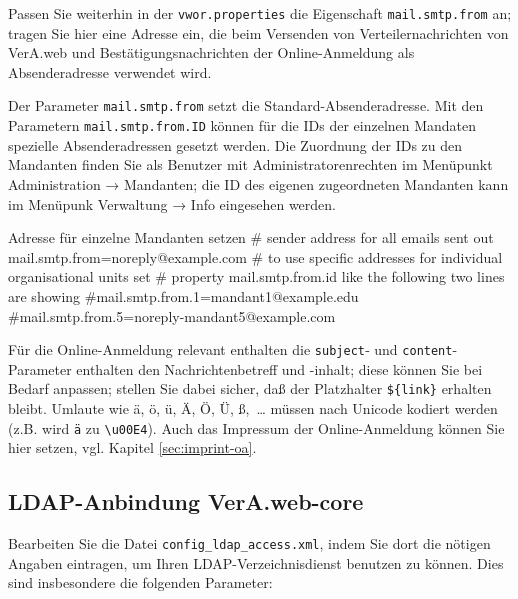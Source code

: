 \documentclass{tarentanleitung}
\begin{document}
\begin{minipage}{\linewidth}
Passen Sie weiterhin in der \texttt{vwor.properties} die Eigenschaft
\texttt{mail.smtp.from} an; tragen Sie hier eine Adresse ein, die beim
Versenden von Verteilernachrichten von VerA.web und Bestätigungsnachrichten der Online-Anmeldung
als Absenderadresse verwendet wird.

Der Parameter \texttt{mail.smtp.from} setzt die Standard-Absenderadresse.
Mit den Parametern \texttt{mail.smtp.from.ID} können für die IDs der einzelnen
Mandaten spezielle Absenderadressen gesetzt werden. Die Zuordnung der IDs zu
den Mandanten finden Sie als Benutzer mit Administratorenrechten im Menüpunkt
Administration → Mandanten; die ID des eigenen zugeordneten Mandanten kann
im Menüpunk Verwaltung → Info eingesehen werden.

\begin{lstdump}{Adresse für einzelne Mandanten setzen}
# sender address for all emails sent out
mail.smtp.from=noreply@example.com
# to use specific addresses for individual organisational units set
# property mail.smtp.from.{id} like the following two lines are showing
#mail.smtp.from.1=mandant1@example.edu
#mail.smtp.from.5=noreply-mandant5@example.com
\end{lstdump}

Für die Online-Anmeldung relevant enthalten die \texttt{subject}‑
und \texttt{content}-Parameter enthalten den Nachrichtenbetreff und
-inhalt; diese können Sie bei Bedarf anpassen; stellen Sie dabei
sicher, daß der Platzhalter \texttt{\$\{link\}} erhalten bleibt.
Umlaute wie ä, ö, ü, Ä, Ö, Ü, ß,~… müssen nach Unicode kodiert
werden (z.B. wird \texttt{ä} zu \texttt{\textbackslash{}u00E4}).
Auch das Impressum der Online-Anmeldung können Sie hier setzen,
vgl. Kapitel \ref{sec:imprint-oa}.


\end{minipage}

\subsection{LDAP-Anbindung VerA.web-core}\label{subsec:setup-core-ldap}

Bearbeiten Sie die Datei \texttt{config\_ldap\_access.xml}, indem Sie
dort die nötigen Angaben eintragen, um Ihren LDAP-Verzeichnisdienst
benutzen zu können. Dies sind insbesondere die folgenden Parameter:\keinumbruch
\end{document}
